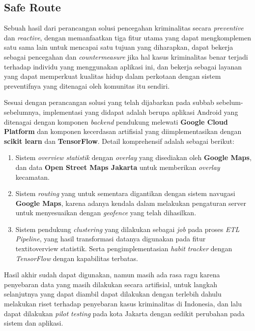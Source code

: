 \subsection{Safe Route}

Sebuah hasil dari perancangan solusi pencegahan kriminalitas secara \textit{preventive} dan \textit{reactive}, dengan memanfaatkan tiga fitur utama yang dapat mengkomplemen satu sama lain untuk mencapai satu tujuan yang diharapkan, dapat bekerja sebagai pencegahan dan \textit{countermeasure} jika hal kasus kriminalitas benar terjadi terhadap individu yang menggunakan aplikasi ini, dan bekerja sebagai layanan yang dapat memperkuat kualitas hidup dalam perkotaan dengan sistem preventifnya yang ditenagai oleh komunitas itu sendiri.

Sesuai dengan perancangan solusi yang telah dijabarkan pada subbab sebelum-sebelumnya, implementasi yang didapat adalah berupa aplikasi Android yang ditenagai dengan komponen \textit{backend} pendukung melewati \textbf{Google Cloud Platform} dan komponen kecerdasan artifisial yang diimplementasikan dengan \textbf{scikit learn} dan \textbf{TensorFlow}. Detail komprehensif adalah sebagai berikut:
\begin{enumerate}
    \item Sistem \textit{overview statistik} dengan \textit{overlay} yang disediakan oleh \textbf{Google Maps}, dan data \textbf{Open Street Maps Jakarta} untuk memberikan \textit{overlay} kecamatan.
    \item Sistem \textit{routing} yang untuk sementara digantikan dengan sistem navugasi \textbf{Google Maps}, karena adanya kendala dalam melakukan pengaturan server untuk menyesuaikan dengan \textit{geofence} yang telah dihasilkan.
    \item Sistem pendukung \textit{clustering} yang dilakukan sebagai \textit{job} pada proses \textit{ETL Pipeline}, yang hasil transformasi datanya digunakan pada fitur \\textit{overview} statistik. Serta pengimplementasian \textit{habit tracker} dengan \textit{TensorFlow} dengan kapabilitas terbatas.
\end{enumerate}
Hasil akhir sudah dapat digunakan, namun masih ada rasa ragu karena penyebaran data yang masih dilakukan secara artifisial, untuk langkah selanjutnya yang dapat diambil dapat dilakukan dengan terlebih dahulu melakukan riset terhadap penyebaran kasus kriminalitas di Indonesia, dan lalu dapat dilakukan \textit{pilot testing} pada kota Jakarta dengan sedikit perubahan pada sistem dan aplikasi.

